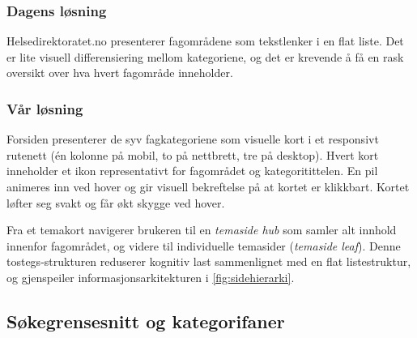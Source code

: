 \subsubsection{Dagens løsning}
\label{sec:temakort-idag}


Helsedirektoratet.no presenterer fagområdene som tekstlenker i en flat
liste. Det er lite visuell differensiering mellom kategoriene, og det er
krevende å få en rask oversikt over hva hvert fagområde inneholder.

\subsubsection{Vår løsning}
\label{sec:temakort-var}


Forsiden presenterer de syv fagkategoriene som visuelle kort i et
responsivt rutenett (én kolonne på mobil, to på nettbrett, tre på
desktop). Hvert kort inneholder et ikon representativt for fagområdet
og kategoritittelen. En pil animeres inn ved hover og gir visuell
bekreftelse på at kortet er klikkbart. Kortet løfter seg svakt og får
økt skygge ved hover.

Fra et temakort navigerer brukeren til en \textit{temaside hub} som
samler alt innhold innenfor fagområdet, og videre til individuelle
temasider (\textit{temaside leaf}). Denne tostegs-strukturen reduserer
kognitiv last sammenlignet med en flat listestruktur, og gjenspeiler
informasjonsarkitekturen i \autoref{fig:sidehierarki}.

\subsection{Søkegrensesnitt og kategorifaner}
\label{sec:sokegrensesnitt}

